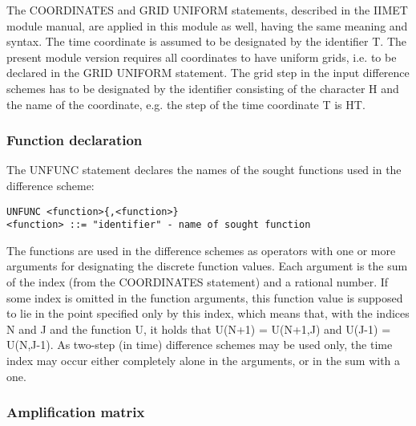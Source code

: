      The COORDINATES and GRID UNIFORM statements, described in the IIMET
module  manual,  are  applied  in  this  module as well, having the same
meaning and syntax. The time coordinate is assumed  to be  designated by
the identifier T. The present module version requires all coordinates to
have uniform grids, i.e. to be declared in  the GRID  UNIFORM statement.
The grid  step in  the input  difference schemes has to be designated by
the identifier consisting  of  the  character  H  and  the  name  of the
coordinate, e.g. the step of the time coordinate T is HT.


\subsubsection{Function declaration}


     The  UNFUNC  statement  declares  the names of the sought functions
used in the difference scheme:
\begin{verbatim}
UNFUNC <function>{,<function>}
<function> ::= "identifier" - name of sought function
\end{verbatim}
The functions are used in the difference schemes  as operators  with one
or  more  arguments  for  designating the discrete function values. Each
argument is the sum of the index (from the COORDINATES  statement) and a
rational number.  If some  index is  omitted in  the function arguments,
this function value is supposed to  lie in  the point  specified only by
this index,  which means that, with the indices N and J and the function
U, it holds that U(N+1) =  U(N+1,J) and  U(J-1) =  U(N,J-1). As two-step
(in time)  difference schemes may be used only, the time index may occur
either completely alone in the arguments, or in the sum with a one.


\subsubsection{Amplification matrix}

